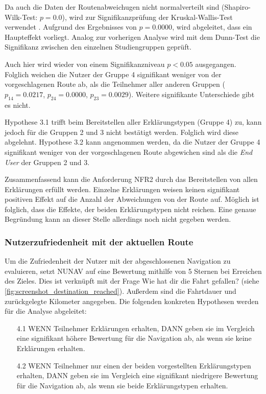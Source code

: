 Da auch die Daten der Routenabweichugen nicht normalverteilt sind (Shapiro-Wilk-Test: $ p = 0.0 $), wird zur Signifikanzprüfung der Kruskal-Wallis-Test verwendet \cite{wohlin2012experimentation}. Aufgrund des Ergebnisses von $ p = 0.0000 $, wird abgeleitet, dass ein Haupteffekt vorliegt. Analog zur vorherigen Analyse wird mit dem Dunn-Test die Signifikanz zwischen den einzelnen Studiengruppen geprüft. 

Auch hier wird wieder von einem Signifikanzniveau $ p < 0.05 $ ausgegangen. Folglich weichen die Nutzer der Gruppe 4 signifikant weniger von der vorgeschlagenen Route ab, als die Teilnehmer aller anderen Gruppen ($ p_{14} = 0.0217 $, $ p_{24} = 0.0000 $, $ p_{23} = 0.0029 $). Weitere signifikante Unterschiede gibt es nicht.

Hypothese 3.1 trifft beim Bereitstellen aller Erklärungstypen (Gruppe 4) zu, kann jedoch für die Gruppen 2 und 3 nicht bestätigt werden. Folglich wird diese abgelehnt. Hypothese 3.2 kann angenommen werden, da die Nutzer der Gruppe 4 signifikant weniger von der vorgeschlagenen Route abgewichen sind als die \textit{End User} der Gruppen 2 und 3.

Zusammenfassend kann die Anforderung NFR2 durch das Bereitstellen von allen Erklärungen erfüllt werden. Einzelne Erklärungen weisen keinen signifikant positiven Effekt auf die Anzahl der Abweichungen von der Route auf. Möglich ist folglich, dass die Effekte, der beiden Erklärungstypen nicht reichen. Eine genaue Begründung kann an dieser Stelle allerdings noch nicht gegeben werden.

\subsubsection{Nutzerzufriedenheit mit der aktuellen Route}

Um die Zufriedenheit der Nutzer mit der abgeschlossenen Navigation zu evaluieren, setzt NUNAV auf eine Bewertung mithilfe von 5 Sternen bei Erreichen des Zieles. Dies ist verknüpft mit der Frage \glqq Wie hat dir die Fahrt gefallen?\grqq{} (siehe \autoref{fig:screenshot_destination_reached}). Außerdem sind die Fahrtdauer und zurückgelegte Kilometer angegeben. Die folgenden konkreten Hypothesen werden für die Analyse abgeleitet:

\begin{enumerate}
    \item[4.1] WENN Teilnehmer Erklärungen erhalten, DANN geben sie im Vergleich eine signifikant höhere Bewertung für die Navigation ab, als wenn sie keine Erklärungen erhalten.
    \item[4.2] WENN Teilnehmer nur einen der beiden vorgestellten Erklärungstypen erhalten, DANN geben sie im Vergleich eine signifikant niedrigere Bewertung für die Navigation ab, als wenn sie beide Erklärungstypen erhalten.
\end{enumerate}

